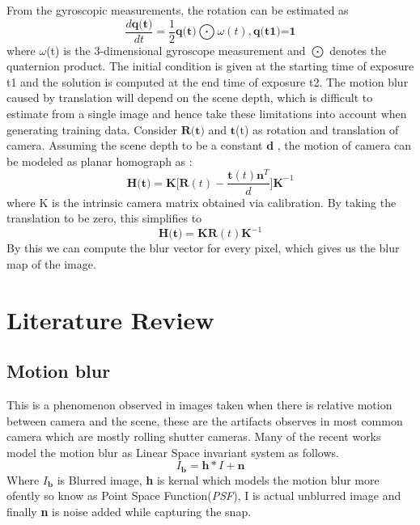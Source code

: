 \documentclass[10pt,twocolumn,letterpaper]{article}
\begin{document}
From the gyroscopic measurements, the rotation can be estimated as
\begin{equation}
    \frac{d \textbf{q(t)}}{dt} = \frac{1}{2}\textbf{q(t)} \bigodot \omega(t), \textbf{q(t1)=1}
\end{equation}
where $\omega$(t) is the 3-dimensional gyroscope measurement and $\bigodot$ denotes the quaternion product. The initial condition is given at the starting time of exposure t1 and the solution is computed at the end time of exposure t2.
The motion blur caused by translation will depend on the scene depth, which is difficult to estimate from a single image and hence take these limitations into account when generating training data. Consider $\textbf{R(t)}$ and $\textbf{t}$(t) as rotation and translation of camera. Assuming the scene depth to be a constant $\textbf{d}$ , the motion of camera can be modeled as planar homograph as :
\begin{equation}
    \textbf{H(t)} = \textbf{K[R}(t) - \frac{\textbf{t}(t)\textbf{n}^{T}}{d}\textbf{]K}^{-1}
\end{equation}
where K is the intrinsic camera matrix obtained via calibration. By taking the translation to be zero, this simplifies to 
\begin{equation}
    \textbf{H(t)} = \textbf{KR}(t)\textbf{K}^{-1}
\end{equation}
By this we can compute the blur vector for every pixel, which gives us the blur map of the image.
\section{Literature Review}
\label{sec:literature}
\subsection{Motion blur}
This is a phenomenon observed in images taken when there is relative motion between camera and the scene, these are the artifacts observes in most common camera which are mostly rolling shutter cameras. Many of the recent works model the motion blur as Linear Space invariant system as follows.
\begin{equation}
I_{\textbf{b}} = \textbf{h}*I + \textbf{n}
\end{equation}
Where $I_{\textbf{b}}$ is Blurred image, \textbf{h} is kernal which models the motion blur more ofently so know as Point Space Function(\textit{PSF}), I is actual unblurred image and finally \textbf{n} is noise added while capturing the snap.
\end{document}
